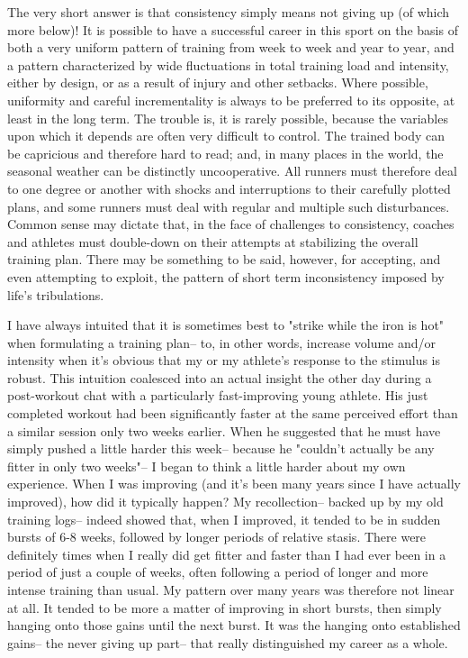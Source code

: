 The very short answer is that consistency simply means not giving up (of which more below)! It is possible to have a successful career in this sport on the basis of both a very uniform pattern of training from week to week and year to year, and a pattern characterized by wide fluctuations in total training load and intensity, either by design, or as a result of injury and other setbacks. Where possible, uniformity and careful incrementality is always to be preferred to its opposite, at least in the long term. The trouble is, it is rarely possible, because the variables upon which it depends are often very difficult to control. The trained body can be capricious and therefore hard to read; and, in many places in the world, the seasonal weather can be distinctly uncooperative. All runners must therefore deal to one degree or another with shocks and interruptions to their carefully plotted plans, and some runners must deal with regular and multiple such disturbances. Common sense may dictate that, in the face of challenges to consistency, coaches and athletes must double-down on their attempts at stabilizing the overall training plan. There may be something to be said, however, for accepting, and even attempting to exploit, the pattern of short term inconsistency imposed by life's tribulations.

I have always intuited that it is sometimes best to "strike while the iron is hot" when formulating a training plan-- to, in other words, increase volume and/or intensity when it's obvious that my or my athlete's response to the stimulus is robust. This intuition coalesced into an actual insight the other day during a post-workout chat with a particularly fast-improving young athlete. His just completed workout had been significantly faster at the same perceived effort than a similar session only two weeks earlier. When he suggested that he must have simply pushed a little harder this week-- because he "couldn't actually be any fitter in only two weeks"-- I began to think a little harder about my own experience. When I was improving (and it's been many years since I have actually improved), how did it typically happen? My recollection-- backed up by my old training logs-- indeed showed that, when I improved, it tended to be in sudden bursts of 6-8 weeks, followed by longer periods of relative stasis. There were definitely times when I really did get fitter and faster than I had ever been in a period of just a couple of weeks, often following a period of longer and more intense training than usual. My pattern over many years was therefore not linear at all. It tended to be more a matter of improving in short bursts, then simply hanging onto those gains until the next burst. It was the hanging onto established gains-- the never giving up part-- that really distinguished my career as a whole.

